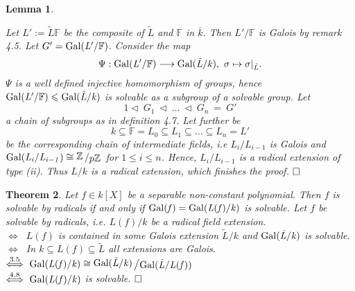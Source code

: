 \documentclass[11pt]{book}
\newtheorem{theorem}{Theorem}[section]
\newtheorem{lemma}[theorem]{Lemma}
\theoremstyle{nonumberbreak}
\newenvironment{pr}[1][]{\ifthenelse{\equal{#1}{}}{\proof}{\proof[#1]}\rm}{\endproof}
\newcommand{\slant}[2]{{\raisebox{.1em}{$#1$}\left/\raisebox{-.1em}{$#2$}\right.}}
\begin{document}
\begin{spacing}{1.3}
\begin{lemma}
\begin{pr}
\begin{compactitem}
\begin{compactitem}
Let $L':=\tilde{L}\mathbb{F}$ be the composite of $\tilde{L}$ and $\mathbb{F}$ in $\overline{k}$. Then $L'/\mathbb{F}$ is Galois by remark 4.5. Let $G'=\rm{Gal}\it(L'/\mathbb{F})$. Consider the map
$$\Psi: \rm{Gal}\it(L'/\mathbb{F}) \longrightarrow \rm{Gal}\it(\tilde{L}/k), \textrm{ } \sigma \mapsto \sigma |_{\tilde{L}}.$$
$\Psi$ is a well defined injective homomorphism of groups, hence $\rm{Gal}\it(L'/\mathbb{F}) \leqslant \rm{Gal}\it(\tilde{L}/k)$ is solvable as a subgroup of a solvable group. Let 
$$1 \triangleleft \ G_1\ \triangleleft\ \dots \ \triangleleft\ G_n \ =\ G'$$
a chain of subgroups as in definition 4.7. Let further be 
$$k \subseteq \mathbb{F}=L_0 \subseteq L_1 \subseteq \dots \subseteq L_n=L'$$
be the corresponding chain of intermediate fields, i.e $L_{i}/L_{i-1}$ is Galois and $\gal(L_{i}/L_{i-1}) \cong \slant{\mathbb{Z}}{p \mathbb{Z}}$ for $1 \leqslant i \leqslant n$.
Hence, $L_{i}/L_{i-1}$ is a radical extension of type (ii).
Thus $L/k$ is a radical extension, which finishes the proof. $\hfill \Box$
\end{compactitem}
\end{compactitem}
\end{pr}
\end{lemma}

\begin{theorem}%
Let $f \in k[X]$ be a separable non-constant polynomial. Then $f$ is solvable by radicals if and only if $\rm{Gal}\it(f)=\rm{Gal}\it(L(f)/k)$ is solvable.
\begin{pr}
Let $f$ be solvable by radicals, i.e. $L(f)/k$ be a radical field extension.\\
$\Longleftrightarrow \ $ $L(f)$ is contained in some Galois extension $\tilde{L}/k$ and $\rm{Gal}\it(\tilde{L}/k)$ is solvable.\\
$\Longleftrightarrow \ $ In $k\subseteq L(f) \subseteq \tilde{L}$ all extensions are Galois.\\
$\overset{3.5}{\Longleftrightarrow} \ \gal(L(f)/k) \cong \slant{\gal(\tilde{L}/k)}{\gal(\tilde{L}/L(f))}$\\
$\overset{4.8}{\Longleftrightarrow} \ \gal(L(f)/k)$ is solvable. $\hfill \Box$
\end{pr}
\end{theorem}


\end{spacing}
\end{document}
